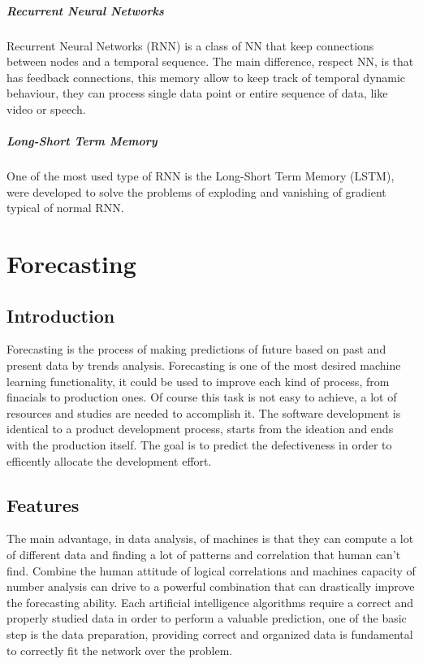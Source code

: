 \documentclass[%
    corpo=12pt,
    twoside,
    oldstyle,
    autoretitolo,
    greek,
    evenboxes,
]{toptesi}
\begin{document}
\paragraph{Recurrent Neural Networks}
Recurrent Neural Networks (RNN) is a class of NN that keep connections between nodes and a temporal sequence. The main difference, respect NN, is that has feedback connections, this memory allow to keep track of temporal dynamic behaviour, they can process single data point or entire sequence of data, like video or speech.

\paragraph{Long-Short Term Memory}
One of the most used type of RNN is the Long-Short Term Memory (LSTM), were developed to solve the problems of exploding and vanishing of gradient typical of normal RNN.



\chapter{Forecasting}
\section{Introduction}
Forecasting is the process of making predictions of future based on past and present data by trends analysis. Forecasting is one of the most desired machine learning functionality, it could be used to improve each kind of process, from finacials to production ones. Of course this task is not easy to achieve, a lot of resources and studies are needed to accomplish it.
The software development is identical to a product development process, starts from the ideation and ends with the production itself.
The goal is to predict the defectiveness in order to efficently allocate the development effort.

\section{Features}
The main advantage, in data analysis, of machines is that they can compute a lot of different data and finding a lot of patterns and correlation that human can't find. Combine the human attitude of logical correlations and machines capacity of number analysis can drive to a powerful combination that can drastically improve the forecasting ability.
Each artificial intelligence algorithms require a correct and properly studied data in order to perform a valuable prediction, one of the basic step is the data preparation, providing correct and organized data is fundamental to correctly fit the network over the problem.
\end{document}
